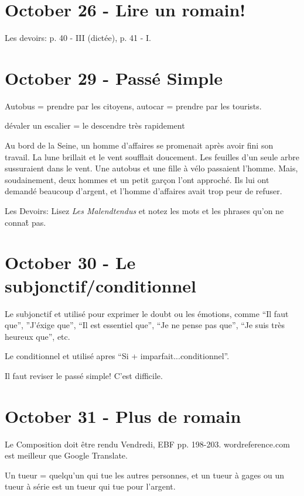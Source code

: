 \documentclass{report}
\begin{document}
\section{October 26 - Lire un romain!}

Les devoirs: p. 40 - III (dict\'ee), p. 41 - I.

\section{October 29 - Pass\'e Simple}

Autobus = prendre par les citoyens, autocar = prendre par les tourists.

d\'evaler un escalier = le descendre tr\`es rapidement 

Au bord de la Seine, un homme d'affaires se promenait apr\`es avoir fini son travail. La lune brillait et le vent soufflait doucement. Les feuilles d'un seule arbre sussuraient dans le vent. Une autobus et une fille \`a v\'elo passaient l'homme. Mais, soudainement, deux hommes et un petit gar\c{c}on l'ont approch\'e. Ils lui ont demand\'e beaucoup d'argent, et l'homme d'affaires avait trop peur de refuser.

Les Devoirs: Lisez \emph{Les Malendtendus} et notez les mots et les phrases qu'on ne conna\^t pas.

\section{October 30 - Le subjonctif/conditionnel}

Le subjonctif et utilis\'e pour exprimer le doubt ou les \'emotions, comme ``Il faut que'', ''J'\'exige que'', ``Il est essentiel que'', ``Je ne pense pas que'', ``Je suis tr\`es heureux que'', etc.

Le conditionnel et utilis\'e apres ``Si + imparfait...conditionnel''. 

Il faut reviser le pass\'e simple! C'est difficile. 

\section{October 31 - Plus de romain}

Le Composition doit \^etre rendu Vendredi, EBF pp. 198-203. wordreference.com est meilleur que Google Translate. 

Un tueur = quelqu'un qui tue les autres personnes, et un tueur \`a gages ou un tueur \`a s\'erie est un tueur qui tue pour l'argent.
\end{document}
